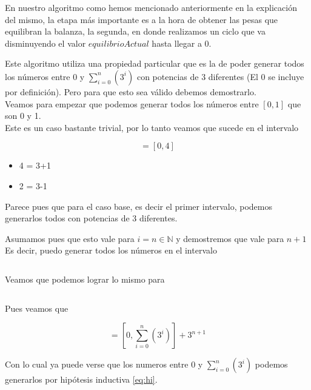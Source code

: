 En nuestro algoritmo como hemos mencionado anteriormente en la explicaci\'on del mismo, la etapa m\'as importante es a la hora de obtener las pesas que equilibran la balanza, la segunda, en donde realizamos un ciclo que va disminuyendo el valor $equilibrioActual$ hasta llegar a 0. 

Este algoritmo utiliza una propiedad particular que es la de poder generar todos los números entre 0 y $\sum_{i=0}^{n}(3^i)$ con potencias de 3 diferentes (El 0 se incluye por definición). Pero para que esto sea válido debemos demostrarlo.\\

Veamos para empezar que podemos generar todos los números entre $[0, 1]$ que son 0 y 1.\\

Este es un caso bastante trivial, por lo tanto veamos que sucede en el intervalo 

\begin{equation}
[0,  \sum_{i=0}^{1}(3^i)] = [0, 4]
\end{equation}

\begin{itemize}
\item 4 = 3+1
\item 2 = 3-1
\end{itemize}

Parece pues que para el caso base, es decir el primer intervalo, podemos generarlos todos con potencias de 3 diferentes. 

Asumamos pues que esto vale para $i = n \in \mathbb{N}$ y demostremos que vale para $n+1$ \\

Es decir, puedo generar todos los números en el intervalo 

\begin{equation}
[0, \sum_{i=0}^{n}(3^i)]
\end{equation} \label{eq:hi}

Veamos que podemos lograr lo mismo para 

\begin{equation}
[0,  \sum_{i=0}^{n+1}(3^i)]
\end{equation}\label{eq:pi}

Pues veamos que 

\begin{equation}
[0, \sum_{i=0}^{n+1}(3^i)] = [0, \sum_{i=0}^{n}(3^i)] + 3^{n+1} 
\end{equation} 

Con lo cual ya puede verse que los numeros entre 0 y $\sum_{i=0}^{n}(3^i)$ podemos generarlos por hipótesis inductiva \eqref{eq:hi}.\\

